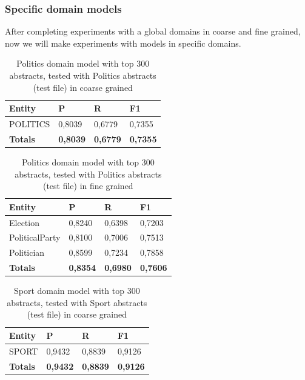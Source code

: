 \documentclass[thesis=M,english]{FITthesis}[2018/05/30]
\begin{document}
\subsubsection{Specific domain models}

	After completing experiments with a global domains in coarse and fine grained, now we will make experiments with models in specific domains.

	\begin{table}[H]\centering
		\begin{tabular}{|l|l|l|l|}
			\hline {\textbf{Entity}} & {\textbf{P}} & {\textbf{R}} & {\textbf{F1}}\\\hline
				POLITICS & 0,8039 & 0,6779 & 0,7355\\\hline
				\textbf{Totals} & \textbf{0,8039} & \textbf{0,6779} & \textbf{0,7355}\\\hline
		\end{tabular}
		\caption{Politics domain model with top 300 abstracts, tested with Politics abstracts (test file) in coarse grained \label{table:PoliticsdomainsWithPoliticsTop300Coarse}}
	\end{table}

	\begin{table}[H]\centering
		\begin{tabular}{|l|l|l|l|}
			\hline {\textbf{Entity}} & {\textbf{P}} & {\textbf{R}} & {\textbf{F1}}\\\hline
				Election & 0,8240 & 0,6398 & 0,7203\\
				PoliticalParty & 0,8100 & 0,7006 & 0,7513\\
				Politician & 0,8599 & 0,7234 & 0,7858\\\hline
				\textbf{Totals} & \textbf{0,8354} & \textbf{0,6980} & \textbf{0,7606}\\\hline
		\end{tabular}
		\caption{Politics domain model with top 300 abstracts, tested with Politics abstracts (test file) in fine grained \label{table:PoliticsdomainsWithPoliticsTop300Fine}}
	\end{table}	
	

	\begin{table}[H]\centering
		\caption{Sport domain model with top 300 abstracts, tested with Sport abstracts (test file) in coarse grained}
		\label{}
		\begin{tabular}{|l|l|l|l|}
			\hline {\textbf{Entity}} & {\textbf{P}} & {\textbf{R}} & {\textbf{F1}}\\\hline
				SPORT & 0,9432 & 0,8839 & 0,9126\\\hline
				\textbf{Totals} & \textbf{0,9432} & \textbf{0,8839} & \textbf{0,9126}\\\hline
		\end{tabular}
	\end{table}
\end{document}
